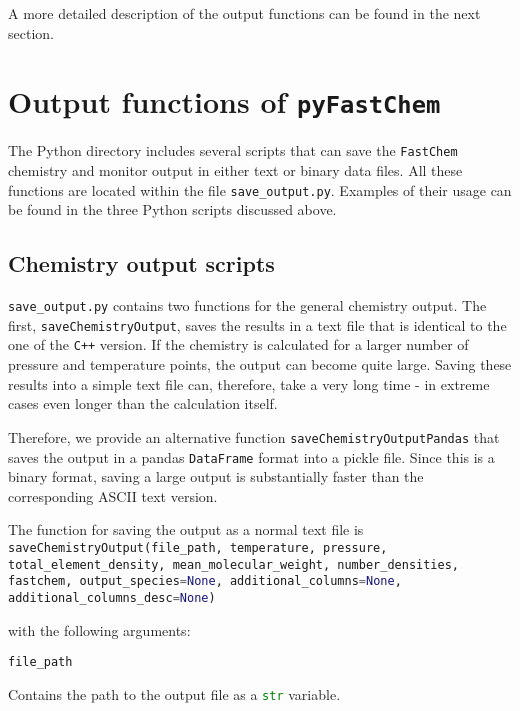 \documentclass[numbers=noenddot]{fcmanual}
\newcommand{\fc}{\texttt{FastChem}\xspace}
\newcommand{\pfc}{\texttt{pyFastChem}\xspace}
\newcommand{\cpp}{\ttt{C++}\xspace}
\newcommand{\ttt}[1]{\texttt {#1}}
\begin{document}
A more detailed description of the output functions can be found in the next section.


\section{Output functions of \pfc}

The Python directory includes several scripts that can save the \fc chemistry and monitor output in either text or binary data files. All these functions are located within the file \texttt{save\_output.py}. Examples of their usage can be found in the three Python scripts discussed above. \\

\subsection{Chemistry output scripts}

\texttt{save\_output.py} contains two functions for the general chemistry output. The first, \lstinline[language=Python]!saveChemistryOutput!, saves the results in a text file that is identical to the one of the \cpp version. If the chemistry is calculated for a larger number of pressure and temperature points, the output can become quite large. Saving these results into a simple text file can, therefore, take a very long time - in extreme cases even longer than the calculation itself.

Therefore, we provide an alternative function \lstinline[language=Python]!saveChemistryOutputPandas! that saves the output in a pandas \lstinline[language=Python]!DataFrame! format into a pickle file. Since this is a binary format, saving a large output is substantially faster than the corresponding ASCII text version.

The function for saving the output as a normal text file is\\

\lstinline[language=Python, breaklines, breakatwhitespace]!saveChemistryOutput(file_path, temperature, pressure, total_element_density, mean_molecular_weight, number_densities, fastchem, output_species=None, additional_columns=None, additional_columns_desc=None)!

\bigbreak

with the following arguments:

\bigbreak

\lstinline[language=Python]!file_path!
\begin{addmargin}[25pt]{0pt}
	Contains the path to the output file as a \lstinline[language=Python]!str! variable.
\end{addmargin}
\end{document}
